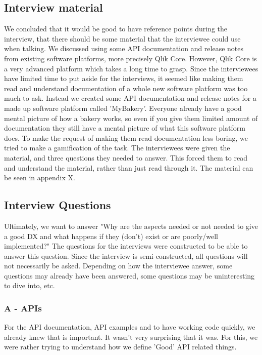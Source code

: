 \documentclass{cslthse-msc}
\begin{document}
    \subsection{Interview material}
    We concluded that it would be good to have reference points during the interview,
    that there should be some material that the interviewee could use when talking.
    We discussed using some API documentation and release notes from existing software platforms,
    more precisely Qlik Core. However, Qlik Core is a very advanced platform which takes a long time
    to grasp. Since the interviewees have limited time to put aside for the interviews, it seemed
    like making them read and understand documentation of a whole new software platform was too much to ask.
    Instead we created some API documentation and release notes for a made up software platform
    called 'MyBakery'. Everyone already have a good mental picture of how a bakery works,
    so even if you give them limited amount of documentation they still have a mental picture
    of what this software platform does. To make the request of making them read documentation less boring,
    we tried to make a gamification of the task. The interviewees were given the material, and
    three questions they needed to answer. This forced them to read and understand the material, rather
    than just read through it. The material can be seen in appendix X.

    \subsection{Interview Questions}

    Ultimately, we want to answer "Why are the aspects needed or not needed
    to give a good DX and what happens if they (don’t) exist or are poorly/well implemented?"
    The questions for the interviews were constructed to be able to answer this question.
    Since the interview is semi-constructed, all questions will not necessarily be asked.
    Depending on how the interviewee answer, some questions may already have been answered,
    some questions may be uninteresting to dive into, etc.
    \subsubsection{A - APIs}
    For the API documentation, API examples and to have working code quickly, we
    already knew that is important. It wasn't very surprising that it was.
    For this, we were rather trying to understand how we define 'Good' API related things.
\end{document}
